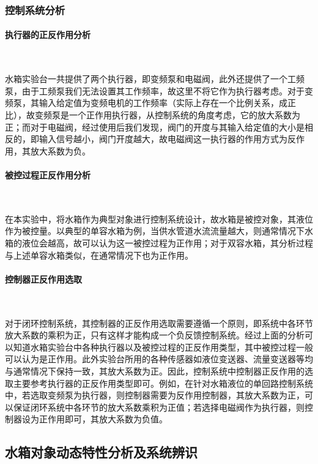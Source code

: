 \documentclass[UTF8]{article}
\begin{document}
\subsubsection{控制系统分析}
\paragraph{执行器的正反作用分析}~{}

水箱实验台一共提供了两个执行器，即变频泵和电磁阀，此外还提供了一个工频泵，由于工频泵我们无法设置其工作频率，故这里不将它作为执行器考虑。对于变频泵，其输入给定值为变频电机的工作频率（实际上存在一个比例关系，成正比），故变频泵是一个正作用执行器，从控制系统的角度考虑，它的放大系数为正；而对于电磁阀，经过使用后我们发现，阀门的开度与其输入给定值的大小是相反的，即输入信号越小，阀门开度越大，故电磁阀这一执行器的作用方式为反作用，其放大系数为负。

\paragraph{被控过程正反作用分析}~{}

在本实验中，将水箱作为典型对象进行控制系统设计，故水箱是被控对象，其液位作为被控量。以典型的单容水箱为例，当供水管道水流流量越大，则通常情况下水箱的液位会越高，故可以认为这一被控过程为正作用；对于双容水箱，其分析过程与上述单容水箱类似，在通常情况下也为正作用。

\paragraph{控制器正反作用选取}~{}

对于闭环控制系统，其控制器的正反作用选取需要遵循一个原则，即系统中各环节放大系数的乘积为正，只有这样才能构成一个负反馈控制系统。经过上面的分析可以知道水箱实验台中各种执行器以及被控过程的正反作用类型，其中被控过程一般可以认为是正作用。此外实验台所用的各种传感器如液位变送器、流量变送器等均与通常情况下保持一致，其放大系数为正。因此，控制系统中控制器正反作用的选取主要参考执行器的正反作用类型即可。例如，在针对水箱液位的单回路控制系统中，若选取变频泵为执行器，则控制器需要为反作用控制器，其放大系数为正，可以保证闭环系统中各环节的放大系数乘积为正值；若选择电磁阀作为执行器，则控制器设为正作用即可，其放大系数为负值。

\subsection{水箱对象动态特性分析及系统辨识}
\end{document}
